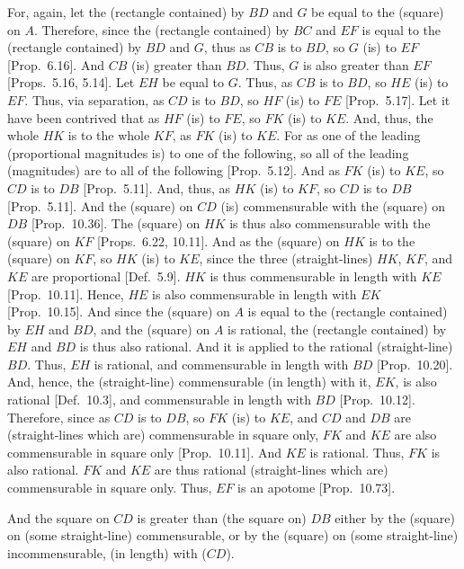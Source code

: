 For, again, let the (rectangle contained) by $BD$ and $G$  be equal
to the (square) on $A$. Therefore, since the (rectangle contained) by $BC$
and $EF$ is equal to the (rectangle contained) by $BD$ and $G$, thus as
$CB$ is to $BD$, so $G$ (is) to $EF$ [Prop.~6.16].
And $CB$ (is) greater than $BD$. Thus, $G$ is also greater than $EF$
[Props.~5.16, 5.14].
Let $EH$ be equal to $G$. Thus, as $CB$ is to $BD$, so $HE$
(is) to $EF$. Thus, via separation, as $CD$ is to $BD$, so $HF$ (is) to $FE$
[Prop.~5.17]. Let it have been contrived that as
$HF$ (is) to $FE$, so $FK$ (is) to $KE$. And, thus, the
whole $HK$ is to the whole $KF$, as $FK$ (is) to $KE$.
For as one of the leading (proportional magnitudes is) to one of
the following, so all of the leading (magnitudes) are to all of the
following [Prop.~5.12]. And as $FK$
(is) to $KE$, so $CD$ is to $DB$ [Prop.~5.11].  And, thus, as $HK$ (is) to $KF$, so
$CD$ is to $DB$ [Prop.~5.11].
And the (square) on  $CD$ (is) 
 commensurable with the (square) on $DB$ [Prop.~10.36]. The (square) on $HK$ is
 thus also commensurable with the (square) on $KF$ [Props.~6.22, 10.11].
  And as the (square) on $HK$ is to the (square) on $KF$, so $HK$ (is)
  to $KE$, since the three (straight-lines) $HK$, $KF$, and $KE$ are
  proportional [Def.~5.9]. $HK$ is thus commensurable
  in length with $KE$ [Prop.~10.11]. 
  Hence, $HE$ is also commensurable in length with $EK$
  [Prop.~10.15]. And since the (square) on $A$
  is equal to the (rectangle contained) by $EH$ and $BD$, and the (square)
  on $A$ is rational, the (rectangle contained) by $EH$ and $BD$ is thus
  also rational. And it is applied to the rational (straight-line) $BD$.
  Thus, $EH$ is  rational, and commensurable in length with $BD$ [Prop.~10.20]. And, hence, the (straight-line)
  commensurable (in length) with it, $EK$, is also rational [Def.~10.3], and commensurable
  in length with $BD$ [Prop.~10.12].  Therefore,
  since as $CD$  is to $DB$, so $FK$ (is) to $KE$, and $CD$ and $DB$
  are (straight-lines which are) commensurable in square only, $FK$ and $KE$ are also
  commensurable in square only [Prop.~10.11]. 
  And $KE$ is rational. Thus, $FK$ is also rational. $FK$ and
  $KE$ are thus rational (straight-lines which are) commensurable in square
  only. Thus, $EF$ is an apotome [Prop.~10.73].
  
  And the square on $CD$ is greater than (the square on) $DB$ either
  by the (square) on (some straight-line) commensurable, or by the
  (square) on (some straight-line) incommensurable, (in length) with ($CD$).
  
